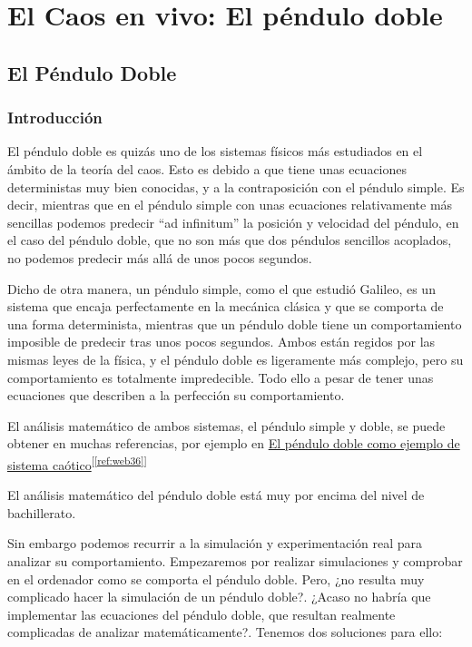 \documentclass[
  10pt,
  a4paper,
  DIV=11,
  numbers=noendperiod,
  open=any]{scrreprt}
\numberwithin{equation}{chapter}
\numberwithin{equation}{section}
\renewcommand{\[}{\begin{equation}}
\renewcommand{\]}{\end{equation}}
\newcommand{\refweb}[3]{%
  \href{#1}{#2}\textsuperscript{[\ref{ref:#3}]}%
}
\begin{document}
\part{El Caos en vivo: El péndulo doble}

\chapter{El Péndulo Doble}\label{el-puxe9ndulo-doble}

\section{Introducción}\label{introducciuxf3n-3}

El péndulo doble es quizás uno de los sistemas físicos más estudiados en
el ámbito de la teoría del caos. Esto es debido a que tiene unas
ecuaciones deterministas muy bien conocidas, y a la contraposición con
el péndulo simple. Es decir, mientras que en el péndulo simple con unas
ecuaciones relativamente más sencillas podemos predecir ``ad infinitum''
la posición y velocidad del péndulo, en el caso del péndulo doble, que
no son más que dos péndulos sencillos acoplados, no podemos predecir más
allá de unos pocos segundos.

Dicho de otra manera, un péndulo simple, como el que estudió Galileo, es
un sistema que encaja perfectamente en la mecánica clásica y que se
comporta de una forma determinista, mientras que un péndulo doble tiene
un comportamiento imposible de predecir tras unos pocos segundos. Ambos
están regidos por las mismas leyes de la física, y el péndulo doble es
ligeramente más complejo, pero su comportamiento es totalmente
impredecible. Todo ello a pesar de tener unas ecuaciones que describen a
la perfección su comportamiento.

El análisis matemático de ambos sistemas, el péndulo simple y doble, se
puede obtener en muchas referencias, por ejemplo en
 \refweb{https://paginaspersonales.unam.mx/app/webroot/files/4554/Publica_20190605182303.pdf}{El péndulo doble como ejemplo de sistema caótico}{web36}

El análisis matemático del péndulo doble está muy por encima del nivel
de bachillerato.

Sin embargo podemos recurrir a la simulación y experimentación real para
analizar su comportamiento. Empezaremos por realizar simulaciones y
comprobar en el ordenador como se comporta el péndulo doble. Pero, ¿no
resulta muy complicado hacer la simulación de un péndulo doble?. ¿Acaso
no habría que implementar las ecuaciones del péndulo doble, que resultan
realmente complicadas de analizar matemáticamente?. Tenemos dos
soluciones para ello:
\end{document}
